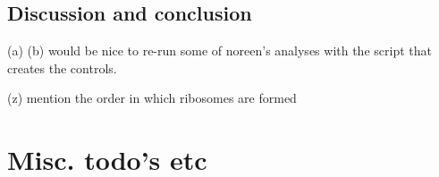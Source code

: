 \subsection*{Discussion and conclusion}

(a) 
(b) would be nice to re-run some of noreen's analyses with the script that creates the controls.

(z) mention the order in which ribosomes are formed \cite{Chen2013}


\clearpage

{\color{red}
    \section{Misc. todo's etc}
    
}
